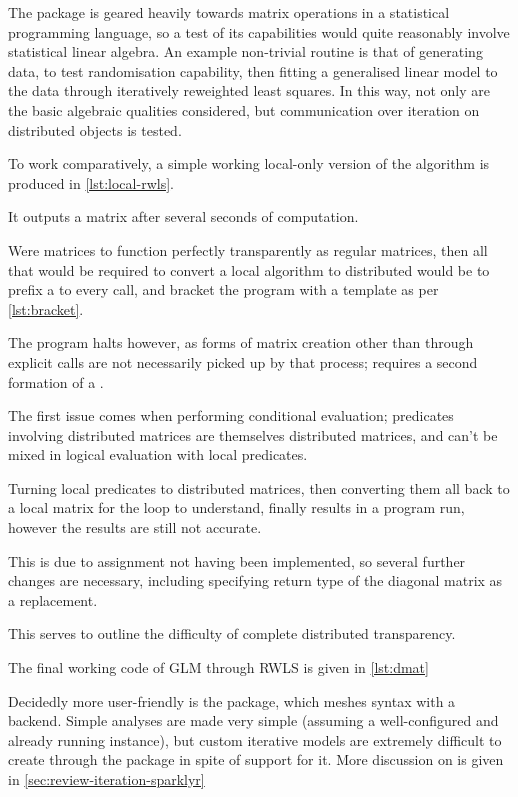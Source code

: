 The package is geared heavily towards matrix operations in a statistical programming language, so a test of its capabilities would quite reasonably involve statistical linear algebra.
An example non-trivial routine is that of generating data, to test randomisation capability, then fitting a generalised linear model to the data through iteratively reweighted least squares.
In this way, not only are the basic algebraic qualities considered, but communication over iteration on distributed objects is tested.

To work comparatively, a simple working local-only version of the algorithm is produced in \cref{lst:local-rwls}.


It outputs a  matrix after several seconds of computation.

Were  matrices to function perfectly transparently as regular matrices, then all that would be required to convert a local algorithm to distributed would be to prefix a  to every  call, and bracket the program with a template as per \cref{lst:bracket}.


The program halts however, as forms of matrix creation other than through explicit  calls are not necessarily picked up by that process;  requires a second formation of a .

The first issue comes when performing conditional evaluation; predicates involving distributed matrices are themselves distributed matrices, and can't be mixed in logical evaluation with local predicates.

Turning local predicates to distributed matrices, then converting them all back to a local matrix for the loop to understand, finally results in a program run, however the results are still not accurate.

This is due to  assignment not having been implemented, so several further changes are necessary, including specifying return type of the diagonal matrix as a replacement.

This serves to outline the difficulty of complete distributed transparency.

The final working code of  GLM through RWLS is given in \cref{lst:dmat}


Decidedly more user-friendly is the  package, which meshes  syntax with a  backend.
Simple analyses are made very simple (assuming a well-configured and already running  instance), but custom iterative models are extremely difficult to create through the package in spite of  support for it.
More discussion on  is given in \cref{sec:review-iteration-sparklyr}
